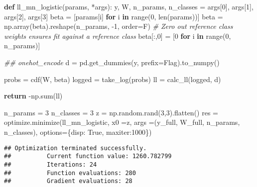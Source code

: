\documentclass[]{tufte-book}
\newenvironment{Shaded}{}{}
\newcommand{\BuiltInTok}[1]{#1}
\newcommand{\CommentTok}[1]{\textcolor[rgb]{0.38,0.63,0.69}{\textit{#1}}}
\newcommand{\ControlFlowTok}[1]{\textcolor[rgb]{0.00,0.44,0.13}{\textbf{#1}}}
\newcommand{\DecValTok}[1]{\textcolor[rgb]{0.25,0.63,0.44}{#1}}
\newcommand{\KeywordTok}[1]{\textcolor[rgb]{0.00,0.44,0.13}{\textbf{#1}}}
\newcommand{\NormalTok}[1]{#1}
\newcommand{\OperatorTok}[1]{\textcolor[rgb]{0.40,0.40,0.40}{#1}}
\newcommand{\StringTok}[1]{\textcolor[rgb]{0.25,0.44,0.63}{#1}}
\newcommand{\VariableTok}[1]{\textcolor[rgb]{0.10,0.09,0.49}{#1}}
\theoremstyle{definition}
\theoremstyle{definition}
\theoremstyle{definition}
\theoremstyle{remark}
\begin{document}
\begin{Shaded}
\begin{Highlighting}[]
\KeywordTok{def}\NormalTok{ ll\_mn\_logistic(params, }\OperatorTok{*}\NormalTok{args):}
\NormalTok{    y, W, n\_params, n\_classes }\OperatorTok{=}\NormalTok{ args[}\DecValTok{0}\NormalTok{], args[}\DecValTok{1}\NormalTok{], args[}\DecValTok{2}\NormalTok{], args[}\DecValTok{3}\NormalTok{]}
\NormalTok{    beta }\OperatorTok{=}\NormalTok{ [params[i] }\ControlFlowTok{for}\NormalTok{ i }\KeywordTok{in} \BuiltInTok{range}\NormalTok{(}\DecValTok{0}\NormalTok{, }\BuiltInTok{len}\NormalTok{(params))]}
\NormalTok{    beta }\OperatorTok{=}\NormalTok{ np.array(beta).reshape(n\_params, }\OperatorTok{{-}}\DecValTok{1}\NormalTok{, order}\OperatorTok{=}\StringTok{\textquotesingle{}F\textquotesingle{}}\NormalTok{)}
    \CommentTok{\# Zero out reference class weights ensures fit against a reference class}
\NormalTok{    beta[:,}\DecValTok{0}\NormalTok{] }\OperatorTok{=}\NormalTok{ [}\DecValTok{0} \ControlFlowTok{for}\NormalTok{ i }\KeywordTok{in} \BuiltInTok{range}\NormalTok{(}\DecValTok{0}\NormalTok{, n\_params)]}
    
    \CommentTok{\#\# onehot\_encode}
\NormalTok{    d }\OperatorTok{=}\NormalTok{ pd.get\_dummies(y, prefix}\OperatorTok{=}\StringTok{\textquotesingle{}Flag\textquotesingle{}}\NormalTok{).to\_numpy()}
    
\NormalTok{    probs }\OperatorTok{=}\NormalTok{ cdf(W, beta)}
\NormalTok{    logged }\OperatorTok{=}\NormalTok{ take\_log(probs)}
\NormalTok{    ll }\OperatorTok{=}\NormalTok{ calc\_ll(logged, d)}
    
    \ControlFlowTok{return} \OperatorTok{{-}}\NormalTok{np.}\BuiltInTok{sum}\NormalTok{(ll)}

\NormalTok{n\_params }\OperatorTok{=} \DecValTok{3} 
\NormalTok{n\_classes }\OperatorTok{=} \DecValTok{3}
\NormalTok{z }\OperatorTok{=}\NormalTok{ np.random.rand(}\DecValTok{3}\NormalTok{,}\DecValTok{3}\NormalTok{).flatten()}
\NormalTok{res }\OperatorTok{=}\NormalTok{ optimize.minimize(ll\_mn\_logistic, x0 }\OperatorTok{=}\NormalTok{z,}
\NormalTok{args }\OperatorTok{=}\NormalTok{(y\_full, W\_full, n\_params, n\_classes), options}\OperatorTok{=}\NormalTok{\{}\StringTok{\textquotesingle{}disp\textquotesingle{}}\NormalTok{: }\VariableTok{True}\NormalTok{, }\StringTok{\textquotesingle{}maxiter\textquotesingle{}}\NormalTok{:}\DecValTok{1000}\NormalTok{\})}
\end{Highlighting}
\end{Shaded}

\begin{verbatim}
## Optimization terminated successfully.
##          Current function value: 1260.782799
##          Iterations: 24
##          Function evaluations: 280
##          Gradient evaluations: 28
\end{verbatim}
\end{document}
